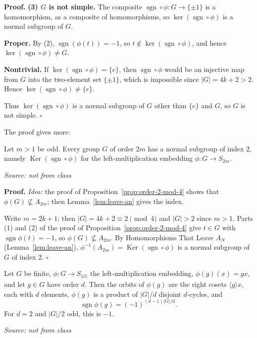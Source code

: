 \documentclass[11pt]{report}
\renewenvironment{proof}[1][Proof]{\noindent\textbf{#1.} }{\hfill$\square$\par\vspace{5pt}}
\newcommand{\srcline}[1]{\par\hfill{\footnotesize\textit{Source: #1}}}
\begin{document}
\begin{proof}
\textbf{(3) $G$ is not simple.} The composite $\operatorname{sgn} \circ \phi \colon G \to \{\pm 1\}$ is a homomorphism, as a composite of homomorphisms, so $\ker(\operatorname{sgn} \circ \phi)$ is a normal subgroup of $G$.

\textbf{Proper.} By (2), $\operatorname{sgn}(\phi(t)) = -1$, so $t \notin \ker(\operatorname{sgn} \circ \phi)$, and hence $\ker(\operatorname{sgn} \circ \phi) \neq G$.

\textbf{Nontrivial.} If $\ker(\operatorname{sgn} \circ \phi) = \{e\}$, then $\operatorname{sgn} \circ \phi$ would be an injective map from $G$ into the two-element set $\{\pm 1\}$, which is impossible since $|G| = 4k + 2 > 2$. Hence $\ker(\operatorname{sgn} \circ \phi) \neq \{e\}$.

Thus $\ker(\operatorname{sgn} \circ \phi)$ is a normal subgroup of $G$ other than $\{e\}$ and $G$, so $G$ is not simple.
\end{proof}

The proof gives more:

\begin{corbox}\label{cor:order-2m-odd-index-two}
Let $m > 1$ be odd. Every group $G$ of order $2m$ has a normal subgroup of index $2$, namely $\operatorname{Ker}(\operatorname{sgn} \circ \phi)$ for the left-multiplication embedding $\phi: G \to S_{2m}$.
\srcline{not from class}
\end{corbox}

\begin{proof}
\textit{Idea:} the proof of Proposition~\ref{prop:order-2-mod-4} shows that $\phi(G) \not\subseteq A_{2m}$; then Lemma~\ref{lem:leave-an} gives the index.\par
Write $m = 2k + 1$; then $|G| = 4k + 2 \equiv 2 \pmod 4$ and $|G| > 2$ since $m > 1$. Parts (1) and (2) of the proof of Proposition~\ref{prop:order-2-mod-4} give $t \in G$ with $\operatorname{sgn}\phi(t) = -1$, so $\phi(G) \not\subseteq A_{2m}$. By Homomorphisms That Leave $A_N$ (Lemma~\ref{lem:leave-an}), $\phi^{-1}(A_{2m}) = \operatorname{Ker}(\operatorname{sgn} \circ \phi)$ is a normal subgroup of $G$ of index $2$.
\end{proof}

\begin{lembox}\label{lem:sign-left-multiplication}
Let $G$ be finite, $\phi: G \to S_{|G|}$ the left-multiplication embedding, $\phi(g)(x) = gx$, and let $g \in G$ have order $d$. Then the orbits of $\phi(g)$ are the right cosets $\langle g \rangle x$, each with $d$ elements, $\phi(g)$ is a product of $|G|/d$ disjoint $d$-cycles, and
\[ \operatorname{sgn}\phi(g) = (-1)^{(d-1)|G|/d}. \]
For $d = 2$ and $|G|/2$ odd, this is $-1$.
\srcline{not from class}
\end{lembox}
\end{document}
